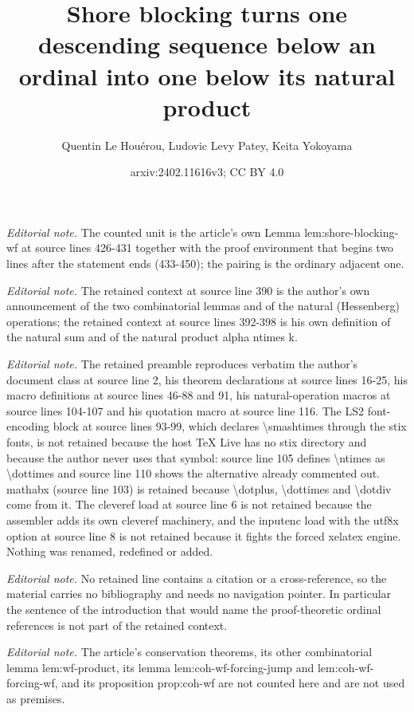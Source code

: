 \documentclass{article}
\title{Shore blocking turns one descending sequence below an ordinal into one below its natural product}
\author{Quentin Le Houérou, Ludovic Levy Patey, Keita Yokoyama}
\date{arxiv:2402.11616v3; CC BY 4.0}
\numberwithin{theorem}{section}
\begin{document}
\maketitle
\noindent\textit{Editorial note.} The counted unit is the article's own Lemma lem:shore-blocking-wf at source lines 426-431 together with the proof environment that begins two lines after the statement ends (433-450); the pairing is the ordinary adjacent one.\par\medskip
\noindent\textit{Editorial note.} The retained context at source line 390 is the author's own announcement of the two combinatorial lemmas and of the natural (Hessenberg) operations; the retained context at source lines 392-398 is his own definition of the natural sum and of the natural product alpha ntimes k.\par\medskip
\noindent\textit{Editorial note.} The retained preamble reproduces verbatim the author's document class at source line 2, his theorem declarations at source lines 16-25, his macro definitions at source lines 46-88 and 91, his natural-operation macros at source lines 104-107 and his quotation macro at source line 116. The LS2 font-encoding block at source lines 93-99, which declares \textbackslash{}smashtimes through the stix fonts, is not retained because the host TeX Live has no stix directory and because the author never uses that symbol: source line 105 defines \textbackslash{}ntimes as \textbackslash{}dottimes and source line 110 shows the alternative already commented out. mathabx (source line 103) is retained because \textbackslash{}dotplus, \textbackslash{}dottimes and \textbackslash{}dotdiv come from it. The cleveref load at source line 6 is not retained because the assembler adds its own cleveref machinery, and the inputenc load with the utf8x option at source line 8 is not retained because it fights the forced xelatex engine. Nothing was renamed, redefined or added.\par\medskip
\noindent\textit{Editorial note.} No retained line contains a citation or a cross-reference, so the material carries no bibliography and needs no navigation pointer. In particular the sentence of the introduction that would name the proof-theoretic ordinal references is not part of the retained context.\par\medskip
\noindent\textit{Editorial note.} The article's conservation theorems, its other combinatorial lemma lem:wf-product, its lemma lem:coh-wf-forcing-jump and lem:coh-wf-forcing-wf, and its proposition prop:coh-wf are not counted here and are not used as premises.\par\medskip
\end{document}

